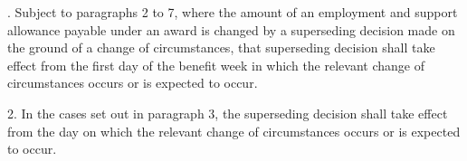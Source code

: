 \documentclass[12pt,a4paper]{article}
\begin{document}
\renewcommand\parthead{--- Schedule 3C}


\medskip

.  Subject to paragraphs 2 to 7, where the amount of an employment and support allowance payable under an award is changed by a superseding decision made on the ground of a change of circumstances, that superseding decision shall take effect from the first day of the benefit week in which the relevant change of circumstances occurs or is expected to occur.

\medskip

2.  In the cases set out in paragraph 3, the superseding decision shall take effect from the day on which the relevant change of circumstances occurs or is expected to occur.

\medskip
\end{document}
